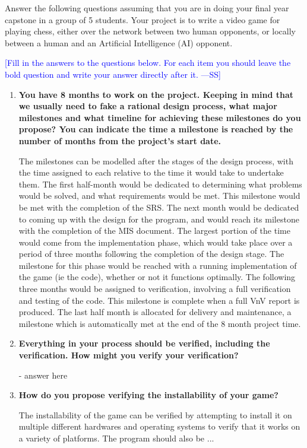 \documentclass[12pt,fleqn]{examtst}
\newcommand{\authornote}[3]{\textcolor{#1}{[#3 ---#2]}}
\newcommand{\authornote}[3]{}
\newcommand{\wss}[1]{\authornote{blue}{SS}{#1}}
\begin{document}

\newpage

 Answer the following questions assuming that you are in doing
your final year capstone in a group of 5 students.  Your project is to write a
video game for playing chess, either over the network between two human
opponents, or locally between a human and an Artificial Intelligence (AI)
opponent.

\bigskip

\noindent \wss{Fill in the answers to the questions below.  For each item you
  should leave the bold question and write your answer directly after it.}

\begin{enumerate}
  
\item \textbf{You have 8 months to work on the project.  Keeping in mind that we
  usually need to fake a rational design process, what major milestones and what
  timeline for achieving these milestones do you propose?  You can indicate the
  time a milestone is reached by the number of months from the project's start date.}

The milestones can be modelled after the stages of the design process, with the time assigned to each relative to the time it would take to undertake them. The first half-month would be dedicated to determining what problems would be solved, and what requirements would be met. This milestone would be met with the completion of the SRS. The next month would be dedicated to coming up with the design for the program, and would reach its milestone with the completion of the MIS document. The largest portion of the time would come from the implementation phase, which would take place over a period of three months following the completion of the design stage. The milestone for this phase would be reached with a running implementation of the game (ie the code), whether or not it functions optimally. The following three months would be assigned to verification, involving a full verification and testing of the code. This milestone is complete when a full VnV report is produced. The last half month is allocated for delivery and maintenance, a milestone which is automatically met at the end of the 8 month project time.
  
\item \textbf{Everything in your process should be verified, including the
    verification.  How might you verify your verification?}

  - answer here
  
\item \textbf{How do you propose verifying the installability of your game?}

The installability of the game can be verified by attempting to install it on multiple different hardwares and operating systems to verify that it works on a variety of platforms. The program should also be ...
  
\end{enumerate}
\end{document}
